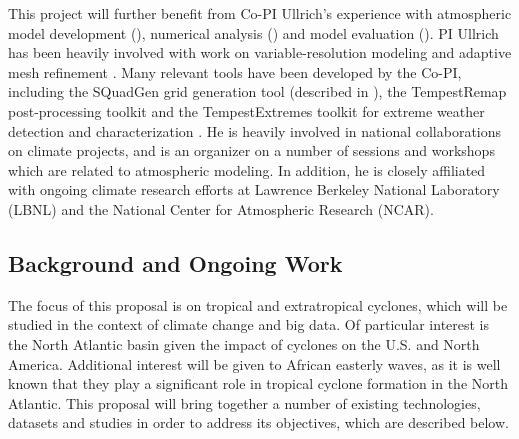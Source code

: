 \documentclass[11pt]{article}
\begin{document}
This project will further benefit from Co-PI Ullrich's experience with atmospheric model development  (\cite{ullrich2010high, PHLPAURDN2011SPRINGER, ullrich2012operator, ullrich2012mcore, ullrich2014fluxform, guba2014viscosity, ullrich2014understanding, ullrich2014global}), numerical analysis (\cite{ullrich2011analysis, ullrich2012considerations}) and model evaluation (\cite{DCMIP2012TESTCASES, ullrich2014proposed, kent2013dynamical, ullrich2014baroclinic}).  PI Ullrich has been heavily involved with work on variable-resolution modeling \citep{zarzycki2014aquaplanet} and adaptive mesh refinement  \citep{collins2013nonhydrostatic, mccorquodale2014adaptive}. Many relevant tools have been developed by the Co-PI, including the SQuadGen grid generation tool (described in \cite{guba2014viscosity}), the TempestRemap post-processing toolkit \citep{ullrich2015remapping} and the TempestExtremes toolkit for extreme weather detection and characterization \citep{ullrich2015extremes}. He is heavily involved in national collaborations on climate projects, and is an organizer on a number of sessions and workshops which are related to atmospheric modeling. In addition, he is closely affiliated with ongoing climate research efforts at Lawrence Berkeley National Laboratory (LBNL) and the National Center for Atmospheric Research (NCAR).

\subsection{Background and Ongoing Work} \label{sec:BackgroundOngoingWork}

The focus of this proposal is on tropical and extratropical cyclones, which will be studied in the context of climate change and big data.  Of particular interest is the North Atlantic basin given the impact of cyclones on the U.S. and North America. Additional interest will be given to African easterly waves, as it is well known that they play a significant role in tropical cyclone formation in the North Atlantic. This proposal will bring together a number of existing technologies, datasets and studies in order to address its objectives, which are described below.
\end{document}
